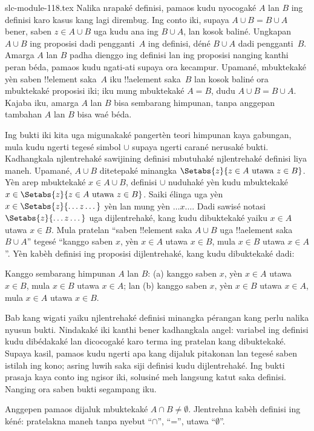\begin{filecontents*}[overwrite]{slc-module-118.tex}
Nalika nrapaké definisi, pamaos kudu nyocogaké $A$ lan $B$
ing definisi karo kasus kang lagi dirembug. Ing conto iki,
supaya $A \cup B = B \cup A$ bener, saben $z \in A \cup B$
uga kudu ana ing $B \cup A$, lan kosok baliné. Ungkapan $A \cup
B$ ing proposisi dadi pengganti~$A$ ing definisi, déné
$B \cup A$ dadi pengganti~$B$. Amarga $A$ lan $B$ padha dienggo
ing definisi lan ing proposisi nanging kanthi peran béda,
pamaos kudu ngati-ati supaya ora kecampur. Upamané,
mbuktekaké yèn saben !!{element} saka~$A$ iku !!a{element}
saka~$B$ lan kosok baliné ora mbuktekaké proposisi iki;
iku mung mbuktekaké $A = B$, dudu $A \cup B = B \cup A$.
Kajaba iku, amarga $A$ lan $B$ bisa sembarang himpunan,
tanpa anggepan tambahan $A$ lan $B$ bisa waé béda.

Ing bukti iki kita uga migunakaké pangertèn teori himpunan kaya
gabungan, mula kudu ngerti tegesé simbol $\cup$ supaya ngerti
carané nerusaké bukti. Kadhangkala njlentrehaké sawijining
definisi mbutuhaké njlentrehaké definisi liya maneh. Upamané,
$A \cup B$ ditetepaké minangka $\Setabs{z}{z \in A
  \text{ utawa } z \in B}$. Yèn arep mbuktekaké $x \in A \cup
B$, definisi $\cup$ nuduhaké yèn kudu mbuktekaké
$x \in \Setabs{z}{z \in A \text{ utawa } z \in B}$.
Saiki élinga uga yèn $x \in \Setabs{z}{\dots z\dots}$ yèn lan
mung yèn $\dots x\dots$. Dadi sawisé notasi
$\Setabs{z}{\dots z \dots}$ uga dijlentrehaké, kang kudu
dibuktekaké yaiku $x \in A$ utawa $x \in B$. Mula pratelan
``saben !!{element} saka $A \cup B$ uga !!a{element} saka
$B \cup A$'' tegesé ``kanggo saben $x$, yèn $x \in A$
utawa $x \in B$, mula $x \in B$ utawa $x \in A$''.
Yèn kabèh definisi ing proposisi dijlentrehaké, kang kudu
dibuktekaké dadi:

\begin{prop}
Kanggo sembarang himpunan $A$ lan $B$: (a) kanggo saben $x$,
yèn $x \in A$ utawa $x \in B$, mula $x \in B$ utawa $x \in A$;
lan (b) kanggo saben $x$, yèn $x \in B$ utawa $x \in A$,
mula $x \in A$ utawa $x \in B$.
\end{prop}

Bab kang wigati yaiku njlentrehaké definisi minangka pérangan
kang perlu nalika nyusun bukti. Nindakaké iki kanthi bener
kadhangkala angel: variabel ing definisi kudu dibédakaké lan
dicocogaké karo terma ing pratelan kang dibuktekaké. Supaya
kasil, pamaos kudu ngerti apa kang dijaluk pitakonan lan
tegesé saben istilah ing kono; asring luwih saka siji definisi
kudu dijlentrehaké. Ing bukti prasaja kaya conto ing ngisor iki,
solusiné meh langsung katut saka definisi. Nanging ora saben
bukti segampang iku.

\begin{prob}
Anggepen pamaos dijaluk mbuktekaké $A \cap B \neq \emptyset$.
Jlentrehna kabèh definisi ing kéné: pratelakna maneh tanpa
nyebut ``$\cap$'', ``='', utawa ``$\emptyset$''.
\end{prob}


\end{filecontents*}

